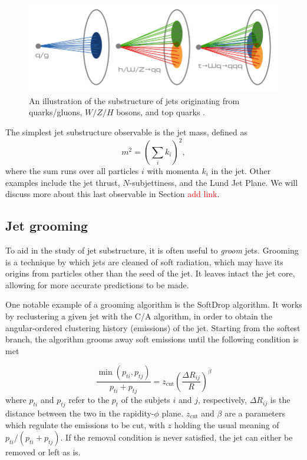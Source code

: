 \documentclass[10pt,a4paper]{book}
\begin{document}
\begin{figure}
    \centering
    \includegraphics[width=0.9\linewidth]{jets}
    \caption{An illustration of the substructure of jets originating from quarks/gluons, $W/Z/H$ bosons, and top quarks \cite{JEDI}.}
    \label{jss}
\end{figure}

The simplest jet substructure observable is the jet mass, defined as
\begin{equation}
    m^2 = \left(\sum_i k_i\right)^2,
\end{equation}
where the sum runs over all particles $i$ with momenta $k_i$ in the jet. Other examples include the jet thrust, $N$-subjettiness, and the Lund Jet Plane. We will discuss more about this last observable in Section \textcolor{red}{add link}.

\subsection{Jet grooming}
To aid in the study of jet substructure, it is often useful to \emph{groom} jets. Grooming is a technique by which jets are cleaned of soft radiation, which may have its origins from particles other than the seed of the jet. It leaves intact the jet core, allowing for more accurate predictions to be made. 

One notable example of a grooming algorithm is the SoftDrop algorithm. It works by reclustering a given jet with the C/A algorithm, in order to obtain the angular-ordered clustering history (emissions) of the jet. Starting from the softest branch, the algorithm grooms away soft emissions until the following condition is met

\begin{equation}
    \frac{\min(p_{ti}, p_{tj})}{p_{ti} + p_{tj}} = z_{\text{cut}}\left(\frac{\Delta R_{ij}}{R}\right)^\beta
\end{equation}
where $p_{ti}$ and $p_{tj}$ refer to the $p_t$ of the subjets $i$ and $j$, respectively, $\Delta R_{ij}$ is the distance between the two in the rapidity-$\phi$ plane. $z_\text{cut}$ and $\beta$ are a parameters which regulate the emissions to be cut, with $z$ holding the usual meaning of $p_{ti}/(p_{ti} + p_{tj})$. If the removal condition is never satisfied, the jet can either be removed or left as is.
\end{document}
